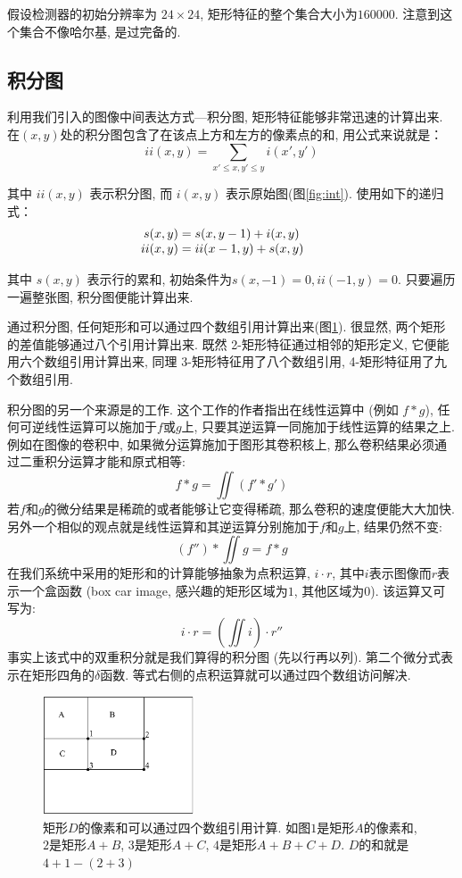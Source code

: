 \documentclass[a4paper,utf8,11pt, onecolumn]{ctexart}
\begin{document}
假设检测器的初始分辨率为 $24\times24$, 矩形特征的整个集合大小为$160000$. 注意到这个集合不像哈尔基, 是过完备的.

\subsection{积分图}
利用我们引入的图像中间表达方式---积分图, 矩形特征能够非常迅速的计算出来. 在$(x, y)$处的积分图包含了在该点上方和左方的像素点的和, 用公式来说就是：
\[
    ii(x, y)= \sum_{x'\leq x, y'\leq y} i(x', y')
\]

其中 $ii(x, y)$ 表示积分图, 而 $i(x, y)$ 表示原始图(图\ref{fig:int}). 使用如下的递归式：
\[
    \begin{array}{r@{}>{{}}l@{\qquad}r@{}>{{}}l}
        s(x,y)&=s(x,y-1)+i(x,y)\\
        ii(x,y)&=ii(x-1,y)+s(x,y)
    \end{array}
\]

其中 $s(x, y)$ 表示行的累和, 初始条件为$s(x,-1)=0, ii(-1,y)=0$. 只要遍历一遍整张图, 积分图便能计算出来. 

通过积分图, 任何矩形和可以通过四个数组引用计算出来(图\ref{fig:feature_calculate}). 很显然, 两个矩形的差值能够通过八个引用计算出来. 既然 2-矩形特征通过相邻的矩形定义, 它便能用六个数组引用计算出来, 同理 3-矩形特征用了八个数组引用, 4-矩形特征用了九个数组引用.

积分图的另一个来源是\citet{simard1999boxlets}的工作. 这个工作的作者指出在线性运算中 (例如 $f\ast g$), 任何可逆线性运算可以施加于$f$或$g$上, 只要其逆运算一同施加于线性运算的结果之上. 例如在图像的卷积中, 如果微分运算施加于图形其卷积核上, 那么卷积结果必须通过二重积分运算才能和原式相等:
\[
    f\ast g = \iint(f'\ast g')
\]
若$f$和$g$的微分结果是稀疏的或者能够让它变得稀疏, 那么卷积的速度便能大大加快. 另外一个相似的观点就是线性运算和其逆运算分别施加于$f$和$g$上, 结果仍然不变:
\[
    (f'')\ast\iint g = f\ast g
\]
在我们系统中采用的矩形和的计算能够抽象为点积运算, $i\cdot r$, 其中$i$表示图像而$r$表示一个盒函数 (box car image, 感兴趣的矩形区域为$1$, 其他区域为$0$). 该运算又可写为:
\[
    i\cdot r = (\iint i)\cdot r''
\]
事实上该式中的双重积分就是我们算得的积分图 (先以行再以列). 第二个微分式表示在矩形四角的$\delta$函数. 等式右侧的点积运算就可以通过四个数组访问解决.
\begin{figure}[!t]
\centering
\includegraphics[width=0.4\textwidth]{feature_calculate.png}
\caption{矩形$D$的像素和可以通过四个数组引用计算. 如图$1$是矩形$A$的像素和, $2$是矩形$A+B$, $3$是矩形$A+C$, $4$是矩形$A+B+C+D$. $D$的和就是$4+1-(2+3)$}
\label{fig:feature_calculate}
\end{figure}
\end{document}
